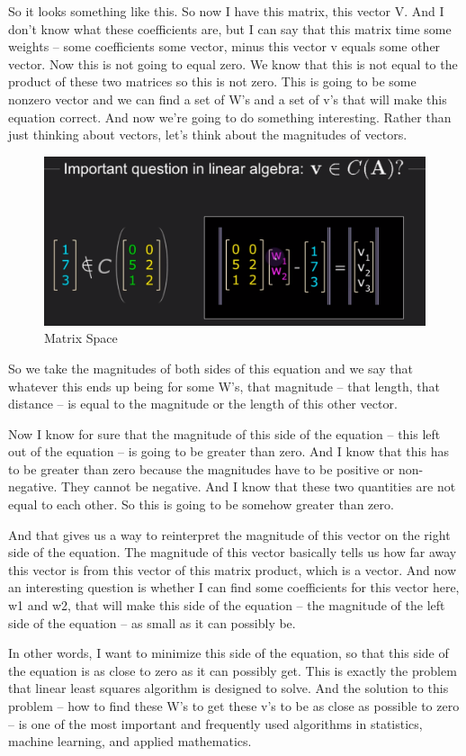 \documentclass[fleqn,10pt]{olplainarticle}
\theoremstyle{definition}
\theoremstyle{remark}
\begin{document}
So it looks something like this. So now I have this matrix, this vector V. And I don't know what these coefficients are, but I can say that this matrix time some weights -- some coefficients some vector, minus this vector v equals some other vector. Now this is not going to equal zero. We know that this is not equal to the product of these two matrices so this is not zero. This is going to be some nonzero vector and we can find a set of W's and a set of v's that will make this equation correct. And now we're going to do something interesting. Rather than just thinking about vectors, let's think about the magnitudes of vectors.

\begin{figure}[ht]
	\centering
	\includegraphics[width=0.5\linewidth]{images/matrix-space-12.png}
	\caption{Matrix Space}
	\label{fig:matrix_space_12}
\end{figure}

So we take the magnitudes of both sides of this equation and we say that whatever this ends up being for some W's, that magnitude -- that length, that distance -- is equal to the magnitude or the length of this other vector.

Now I know for sure that the magnitude of this side of the equation -- this left out of the equation -- is going to be greater than zero. And I know that this has to be greater than zero because the magnitudes have to be positive or non-negative. They cannot be negative. And I know that these two quantities are not equal to each other. So this is going to be somehow greater than zero.

And that gives us a way to reinterpret the magnitude of this vector on the right side of the equation. The magnitude of this vector basically tells us how far away this vector is from this vector of this matrix product, which is a vector. And now an interesting question is whether I can find some coefficients for this vector here, w1 and w2, that will make this side of the equation -- the magnitude of the left side of the equation -- as small as it can possibly be.

In other words, I want to minimize this side of the equation, so that this side of the equation is as close to zero as it can possibly get. This is exactly the problem that linear least squares algorithm is designed to solve. And the solution to this problem -- how to find these W's to get these v's to be as close as possible to zero -- is one of the most important and frequently used algorithms in statistics, machine learning, and applied mathematics.
\end{document}
